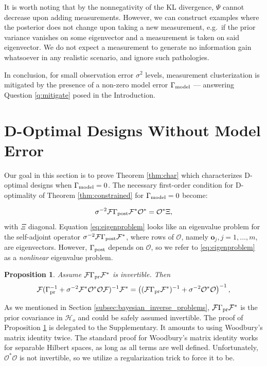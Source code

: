 \documentclass[ba]{imsart}
\newcommand{\hilo}{\mathcal{H}_o}
\newcommand{\obs}{\mathcal{O}}
\newcommand{\fwd}{\mathcal{F}}
\newcommand{\tar}{\Psi}
\newcommand{\meas}{\mathbf{o}}
\theoremstyle{plain}
\newtheorem{proposition}[theorem]{Proposition}
\theoremstyle{definition}
\theoremstyle{remark}
\begin{document}
It is worth noting that by the nonnegativity of the KL divergence,
$\tar$ cannot decrease upon adding measurements. However, we can
construct examples where the posterior does not change upon taking a
new measurement, e.g.~if the prior variance vanishes on some
eigenvector and a measurement is taken on said eigenvector. We do not
expect a measurement to generate no information gain whatsoever in any
realistic scenario, and ignore such pathologies.

In conclusion, for small observation error $\sigma^2$ levels,
measurement clusterization is mitigated by the presence of a non-zero
model error $\Gamma_{\textup{model}}$ --- answering Question \ref{q:mitigate} posed in
the Introduction. \section{D-Optimal Designs Without Model Error}\label{section:vanishing}
Our goal in this section is to prove Theorem \ref{thm:char} which
characterizes D-optimal designs when $\Gamma_{\textup{model}} = 0$. The necessary
first-order condition for D-optimality of Theorem
\ref{thm:constrained} for $\Gamma_{\textup{model}} = 0$ become:

\begin{equation}\label{eq:eigenproblem}
  \sigma^{-2}\fwd \postcov \fwd^* \obs^* = \obs^* \Xi,
\end{equation}
with $\Xi$ diagonal. Equation \eqref{eq:eigenproblem} looks like an
eigenvalue problem for the self-adjoint operator $\sigma^{-2}\fwd
\postcov \fwd^*$, where rows of $\obs$, namely $\meas_j,j=1,\dots, m$,
are eigenvectors. However, $\Gamma_{\textup{post}}$ depends on $\obs$, so we refer
to \eqref{eq:eigenproblem} as a \emph{nonlinear} eigenvalue problem.


\begin{proposition}\label{prop:twice_woodbury}
  Assume $\fwd \prcov \fwd^*$ is invertible. Then
  \begin{align*}
    \begin{split}
      \fwd( \prcov^{-1} + \sigma^{-2}  \fwd^* \obs^* \obs \fwd )^{-1} \fwd^* 
= \left ( (\fwd\prcov\fwd^*)^{-1} + \sigma^{-2}  \obs^* \obs \right )^{-1},
    \end{split}
  \end{align*}  
\end{proposition}

As we mentioned in Section \ref{subsec:bayesian_inverse_problems},
$\fwd \prcov \fwd^*$ is the prior covariance in $\hilo$ and could be
safely assumed invertible. The proof of Proposition
\ref{prop:twice_woodbury} is delegated to the Supplementary. It
amounts to using Woodbury's matrix identity twice. The standard proof
for Woodbury's matrix identity works for separable Hilbert spaces, as
long as all terms are well defined. Unfortunately, $\obs^*\obs$ is not
invertible, so we utilize a regularization trick to force it to be.
\end{document}
